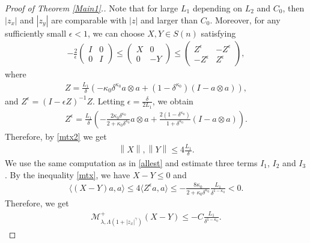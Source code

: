 \documentclass[reqno]{amsart}
\theoremstyle{plain}
\theoremstyle{definition}
\theoremstyle{remark}
\newcommand{\norm}[1]{\left\lVert#1\right\rVert}
\numberwithin{equation}{section}
\begin{document}
\begin{proof}[Proof of Theorem \ref{Main1}.]
     Note that for large $L_1$ depending on $L_2$ and $C_0$, then $|z_x|$ and $ |z_y|$ are comparable with $|z|$ and larger than $C_0$.
     Moreover, for any sufficiently small $\epsilon< 1$, we can choose $X,Y \in S(n)$ satisfying
     \begin{align} \label{mtx2}
     -\frac{2}{\epsilon} 
        \begin{pmatrix}
            I & 0 \\
            0 &I
        \end{pmatrix}
        \leq
        \begin{pmatrix}
             X & 0 \\
             0 &-Y
         \end{pmatrix}
         \leq
         \begin{pmatrix}
             Z^\epsilon & -Z^\epsilon \\
             -Z^\epsilon & Z^\epsilon
         \end{pmatrix},
     \end{align}
     where
     \begin{align*}
         Z =\frac{L_1}{\delta}\left( -\kappa_0\delta^{\kappa_0} a\otimes a + (1-\delta^{\kappa_0})(I-a\otimes a) \right),
     \end{align*}
     and $Z^\epsilon = (I-\epsilon Z)^{-1} Z$.
     Letting $\epsilon = \frac{\delta}{2L_1}$, we obtain
     \begin{align*}
         Z^\epsilon = \frac{L_1}{\delta} \left( -\frac{2\kappa_0\delta^{\kappa_0}}{2+\kappa_0\delta^{\kappa_0}}a \otimes a + \frac{2(1-\delta^{\kappa_0})}{1+\delta^{\kappa_0}}(I-a\otimes a)\right).
     \end{align*}
     Therefore, by \eqref{mtx2} we get
     \begin{align} \label{Xest2}
         \norm{X}, \norm{Y} \leq 4\frac{L_1}{\delta}.
     \end{align}
     We use the same computation as in \eqref{allest} and estimate three terms $I_1$, $I_2$ and $I_3$.
     By the inequality \eqref{mtx}, we have $X-Y \leq 0$ and
     \begin{align*}
         \langle(X-Y)a,a\rangle \leq 4\langle Z^\epsilon a, a\rangle \leq -\frac{8\kappa_0}{2+\kappa_0\delta^{\kappa_0}}\frac{L_1}{\delta^{1-\kappa_0}}<0.
     \end{align*}
     Therefore, we get
     \begin{align*}
         \mathcal{M}^+_{\lambda, \Lambda(1+|z_x|^{\gamma} )}(X-Y) \leq -C\frac{L_1}{\delta^{1-\kappa_0}}.
     \end{align*}

\end{proof}
\end{document}
